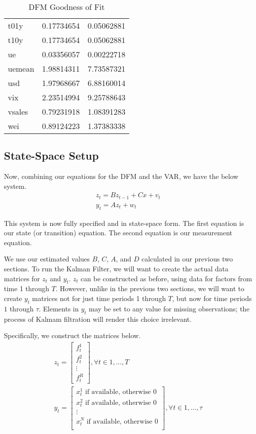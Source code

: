 \documentclass[11pt, letterpaper]{article}\usepackage[]{graphicx}\usepackage[]{color}
\begin{document}
\begin{table}[H]
\begin{tabular}{lrr}
  t01y & 0.17734654 & 0.05062881 \\ 
  t10y & 0.17734654 & 0.05062881 \\ 
  ue & 0.03356057 & 0.00222718 \\ 
  uemean & 1.98814311 & 7.73587321 \\ 
  usd & 1.97968667 & 6.88160014 \\ 
  vix & 2.23514994 & 9.25788643 \\ 
  vsales & 0.79231918 & 1.08391283 \\ 
  wei & 0.89124223 & 1.37383338 \\ 
   \hline
\end{tabular}
\endgroup
\caption{DFM Goodness of Fit} 
\end{table}





\subsection{State-Space Setup}
Now, combining our equations for the DFM and the VAR, we have the below system.
\begin{align*}
z_t = B z_{t-1} + Cx + v_t\\
y_t = A z_t + w_t
\end{align*}

This system is now fully specified and in state-space form. The first equation is our state (or transition) equation. The second equation is our measurement equation. 

We use our estimated values $B$, $C$, $A$, and $D$ calculated in our previous two sections. To run the Kalman Filter, we will want to create the actual data matrices for $z_t$ and $y_t$. $z_t$ can be constructed as before, using data for factors from time 1 through $T$. However, unlike in the previous two sections, we will want to create $y_t$ matrices not for just time periods 1 through $T$, but now for time periods $1$ through $\tau$. Elements in $y_t$ may be set to any value for missing observations; the process of Kalmam filtration will render this choice irrelevant.

Specifically, we construct the matrices below.
\begin{align*}
z_t
=
\begin{bmatrix}
	f^1_{t}\\
	f^2_{t}\\
	\vdots \\
	f^R_{t}
\end{bmatrix}, \forall t \in 1, \dots, T\\
y_t
=
\begin{bmatrix}
	\text{$x^1_{t}$ if available, otherwise 0}\\
	\text{$x^2_{t}$ if available, otherwise 0}\\
	\vdots \\
	\text{$x^N_{t}$ if available, otherwise 0}\\
\end{bmatrix}, \forall t \in 1, \dots, \tau
\end{align*}
\end{document}
